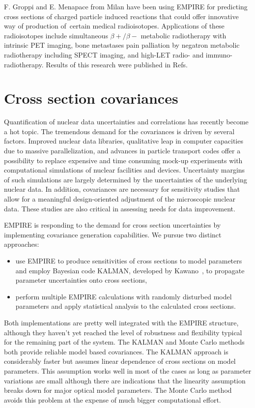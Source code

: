 \documentclass[twocolumn,amsmath,amssymb,10pt,groupedaddress,a4paper]{revtex4}
\begin{document}
F. Groppi and E. Menapace from Milan have been using EMPIRE for predicting cross sections of charged particle induced reactions that could offer innovative way of production of certain medical radioisotopes. Applications of these radioisotopes include simultaneous $\beta+/\beta-$ metabolic radiotherapy with intrinsic PET imaging,  bone metastases pain palliation by negatron metabolic radiotherapy including SPECT imaging,  and high-LET radio- and immuno-radiotherapy. Results of this research were published in Refs.~\cite{Menapace:04, Menapace:05, Groppi:05, Groppi:05a, Groppi:06, Alfassi:06, Persico:06}

\section{Cross section covariances}
Quantification of nuclear data uncertainties and correlations has recently become a hot topic. The tremendous demand for the covariances is driven by several factors.  Improved nuclear data libraries, qualitative leap in computer capacities due to massive parallelization, and advances in particle transport codes offer a possibility to replace expensive and time consuming mock-up experiments with computational simulations of nuclear facilities and devices. Uncertainty margins of such simulations are largely determined by the uncertainties of the underlying nuclear data. In addition, covariances are necessary for sensitivity studies that allow for a meaningful design-oriented adjustment of the microscopic nuclear data. These studies are also critical in assessing needs for data improvement.

EMPIRE is responding to the demand for cross section uncertainties by implementing covariance generation capabilities. We pursue two distinct approaches:
\begin{itemize}
\item use EMPIRE to produce sensitivities of cross sections to model parameters and employ Bayesian code KALMAN, developed by Kawano~\cite{Kawano:97}, to propagate parameter uncertainties onto cross sections,
\item perform multiple EMPIRE calculations with randomly disturbed model parameters and apply statistical analysis to the calculated cross sections.
\end{itemize}

Both implementations are pretty well integrated with the EMPIRE structure, although they haven't yet reached the level of robustness and flexibility typical for the remaining part of the system. The KALMAN and Monte Carlo methods both provide reliable model based covariances. The KALMAN approach is considerably faster but assumes linear dependence of cross sections on model parameters. This assumption works well in most of the cases as long as parameter variations are small although there are indications that the linearity assumption breaks down for major optical model parameters.  The Monte Carlo method avoids this problem at the expense of much bigger computational effort.
\end{document}
